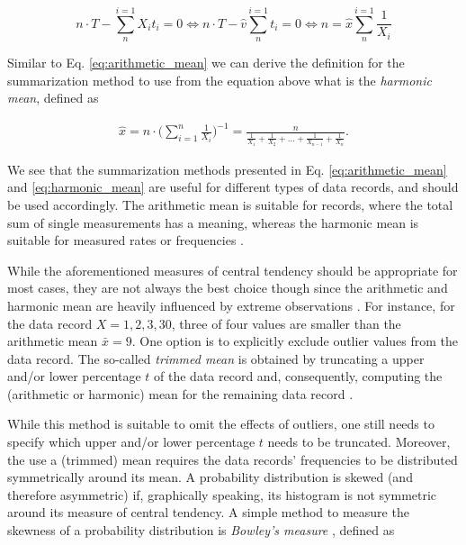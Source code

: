 $$
n\cdot T - \sum_{n}^{i=1} X_it_i = 0 \Leftrightarrow n\cdot T - \hat{v}
\sum_{n}^{i=1} t_i = 0 \Leftrightarrow n = \hat{x} \sum_{n}^{i=1} \frac{1}{X_i}
$$

Similar to Eq. \ref{eq:arithmetic_mean} we can derive the definition for the summarization
method to use from the equation above what is the \emph{harmonic mean}, defined as

\begin{equation} \label{eq:harmonic_mean}
\begin{split}
\hat{x} = n \cdot \bigg(\sum_{i=1}^{n} \frac{1}{X_i}\bigg)^{-1} =
\frac{n}{\frac{1}{X_1} + \frac{1}{X_2} + \ldots +
\frac{1}{X_{n-1}} + \frac{1}{X_n}}.
\end{split}
\end{equation}

We see that the summarization methods presented in Eq. \ref{eq:arithmetic_mean}
and \ref{eq:harmonic_mean} are useful for different types of data records, and
should be used accordingly. The arithmetic mean is suitable for records, where the total sum of single
measurements has a meaning, whereas the harmonic mean is suitable for measured
rates or frequencies \citep{smith_characterizing_1988}.

While the aforementioned measures of central tendency should be appropriate for
most cases, they are not always the best choice though since the arithmetic
and harmonic mean are heavily influenced by extreme observations
\citep{shanmugam_statistics_2015}. 
For instance, for the data record $X = 1, 2, 3, 30$, three of four values are
smaller than the arithmetic mean $\bar{x} = 9$. One option is to explicitly exclude outlier
values from the data record. The so-called \emph{trimmed mean} is
obtained by truncating a upper and/or lower percentage $t$ of the data record
and, consequently, computing the (arithmetic or harmonic) mean for the remaining
data record \citep{shanmugam_statistics_2015}. 

While this method is suitable to omit the effects of outliers, one still needs to specify
which upper and/or lower percentage $t$ needs to be truncated. Moreover, the use
a (trimmed) mean requires the data records' frequencies to be distributed
symmetrically around its mean.
A probability distribution is skewed (and therefore asymmetric) if, graphically speaking, its histogram is not
symmetric around its measure of central tendency. A simple method to measure the
skewness of a probability distribution is \emph{Bowley's measure}
\citep{shanmugam_statistics_2015}, defined as

